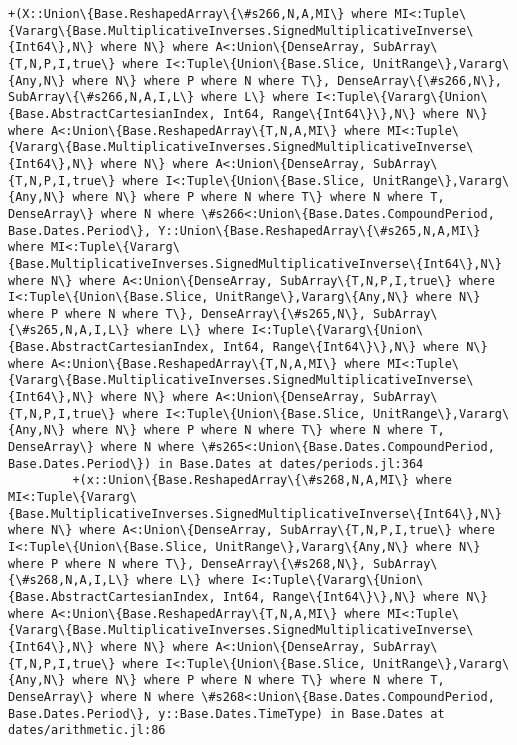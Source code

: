 \documentclass[11pt]{article}
\begin{document}
\begin{Verbatim}[commandchars=\\\{\}]
         +(X::Union\{Base.ReshapedArray\{\#s266,N,A,MI\} where MI<:Tuple\{Vararg\{Base.MultiplicativeInverses.SignedMultiplicativeInverse\{Int64\},N\} where N\} where A<:Union\{DenseArray, SubArray\{T,N,P,I,true\} where I<:Tuple\{Union\{Base.Slice, UnitRange\},Vararg\{Any,N\} where N\} where P where N where T\}, DenseArray\{\#s266,N\}, SubArray\{\#s266,N,A,I,L\} where L\} where I<:Tuple\{Vararg\{Union\{Base.AbstractCartesianIndex, Int64, Range\{Int64\}\},N\} where N\} where A<:Union\{Base.ReshapedArray\{T,N,A,MI\} where MI<:Tuple\{Vararg\{Base.MultiplicativeInverses.SignedMultiplicativeInverse\{Int64\},N\} where N\} where A<:Union\{DenseArray, SubArray\{T,N,P,I,true\} where I<:Tuple\{Union\{Base.Slice, UnitRange\},Vararg\{Any,N\} where N\} where P where N where T\} where N where T, DenseArray\} where N where \#s266<:Union\{Base.Dates.CompoundPeriod, Base.Dates.Period\}, Y::Union\{Base.ReshapedArray\{\#s265,N,A,MI\} where MI<:Tuple\{Vararg\{Base.MultiplicativeInverses.SignedMultiplicativeInverse\{Int64\},N\} where N\} where A<:Union\{DenseArray, SubArray\{T,N,P,I,true\} where I<:Tuple\{Union\{Base.Slice, UnitRange\},Vararg\{Any,N\} where N\} where P where N where T\}, DenseArray\{\#s265,N\}, SubArray\{\#s265,N,A,I,L\} where L\} where I<:Tuple\{Vararg\{Union\{Base.AbstractCartesianIndex, Int64, Range\{Int64\}\},N\} where N\} where A<:Union\{Base.ReshapedArray\{T,N,A,MI\} where MI<:Tuple\{Vararg\{Base.MultiplicativeInverses.SignedMultiplicativeInverse\{Int64\},N\} where N\} where A<:Union\{DenseArray, SubArray\{T,N,P,I,true\} where I<:Tuple\{Union\{Base.Slice, UnitRange\},Vararg\{Any,N\} where N\} where P where N where T\} where N where T, DenseArray\} where N where \#s265<:Union\{Base.Dates.CompoundPeriod, Base.Dates.Period\}) in Base.Dates at dates/periods.jl:364
         +(x::Union\{Base.ReshapedArray\{\#s268,N,A,MI\} where MI<:Tuple\{Vararg\{Base.MultiplicativeInverses.SignedMultiplicativeInverse\{Int64\},N\} where N\} where A<:Union\{DenseArray, SubArray\{T,N,P,I,true\} where I<:Tuple\{Union\{Base.Slice, UnitRange\},Vararg\{Any,N\} where N\} where P where N where T\}, DenseArray\{\#s268,N\}, SubArray\{\#s268,N,A,I,L\} where L\} where I<:Tuple\{Vararg\{Union\{Base.AbstractCartesianIndex, Int64, Range\{Int64\}\},N\} where N\} where A<:Union\{Base.ReshapedArray\{T,N,A,MI\} where MI<:Tuple\{Vararg\{Base.MultiplicativeInverses.SignedMultiplicativeInverse\{Int64\},N\} where N\} where A<:Union\{DenseArray, SubArray\{T,N,P,I,true\} where I<:Tuple\{Union\{Base.Slice, UnitRange\},Vararg\{Any,N\} where N\} where P where N where T\} where N where T, DenseArray\} where N where \#s268<:Union\{Base.Dates.CompoundPeriod, Base.Dates.Period\}, y::Base.Dates.TimeType) in Base.Dates at dates/arithmetic.jl:86

\end{Verbatim}
\end{document}
